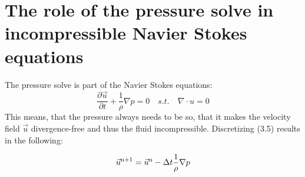 \section{The role of the pressure solve in incompressible Navier Stokes equations}
The pressure solve is part of the Navier Stokes equations:
\begin{equation} \label{navier-stokes-pressure}
\frac{\partial \vec{u}}{\partial t} + \frac{1}{\rho}  \nabla p = 0 \quad s.t. \quad \nabla \cdot u = 0
\end{equation}
This means, that the pressure always needs to be so, that it makes the velocity field $\vec{u}$ divergence-free and thus the fluid incompressible. Discretizing (3.5) results in the following:

\begin{equation} \label{navier-stokes12}
\vec{u} \textsuperscript{n+1} = \vec{u} \textsuperscript{n} - \Delta t \frac{1}{\rho}  \nabla p
\end{equation}